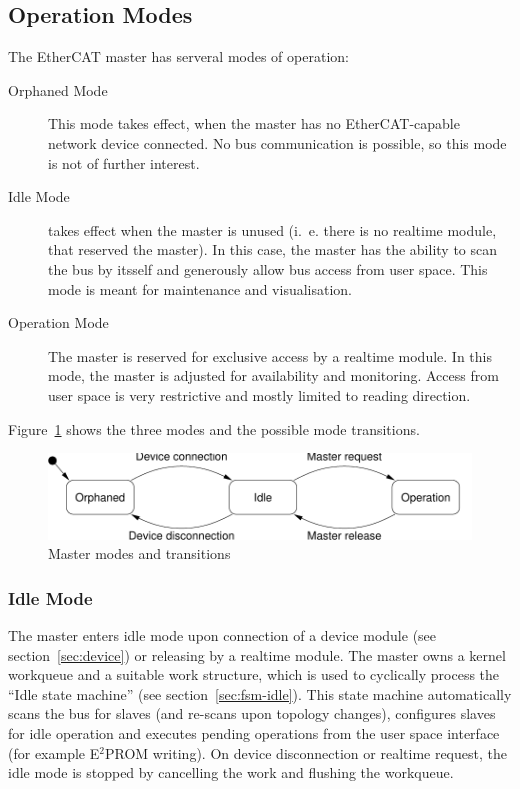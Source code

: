 \documentclass[a4paper,12pt,BCOR6mm,bibtotoc,idxtotoc]{scrbook}
\begin{document}

\subsection{Operation Modes}

The EtherCAT master has serveral modes of operation:

\begin{description}
\item[Orphaned Mode] This mode takes effect, when the master has no
  EtherCAT-capable network device connected. No bus communication is
  possible, so this mode is not of further interest.
\item[Idle Mode] takes effect when the master is
  unused (i.~e. there is no realtime module, that reserved the
  master). In this case, the master has the ability to scan the bus by
  itsself and generously allow bus access from user space.  This mode
  is meant for maintenance and visualisation.
\item[Operation Mode] The master is reserved for
  exclusive access by a realtime module. In this mode, the master is
  adjusted for availability and monitoring. Access from user space is
  very restrictive and mostly limited to reading direction.

\end{description}

Figure~\ref{fig:modes} shows the three modes and the possible mode
transitions.

\begin{figure}[htbp]
  \centering
  \includegraphics[width=.9\textwidth]{images/modes}
  \caption{Master modes and transitions}
  \label{fig:modes}
\end{figure}

\subsubsection{Idle Mode}

The master enters idle mode upon connection of a device module (see
section~\ref{sec:device}) or releasing by a realtime module. The
master owns a kernel workqueue and a suitable work structure, which is
used to cyclically process the ``Idle state machine'' (see
section~\ref{sec:fsm-idle}). This state machine automatically scans
the bus for slaves (and re-scans upon topology changes), configures
slaves for idle operation and executes pending operations from the
user space interface (for example E$^2$PROM writing). On device
disconnection or realtime request, the idle mode is stopped by
cancelling the work and flushing the workqueue.
\end{document}

